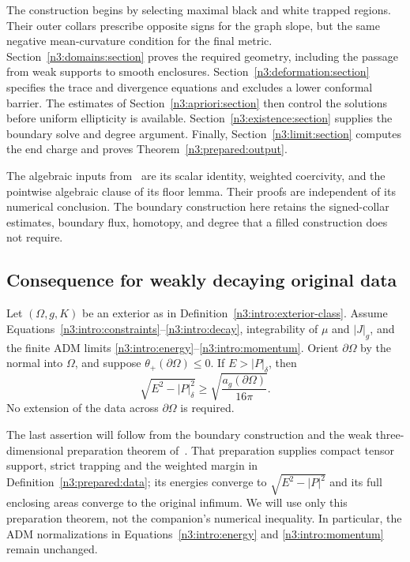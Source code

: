 The construction begins by selecting maximal black and white trapped
regions. Their outer collars prescribe opposite signs for the graph
slope, but the same negative mean-curvature condition for the final
metric. Section~\ref{n3:domains:section} proves the required geometry,
including the passage from weak supports to smooth enclosures.
Section~\ref{n3:deformation:section} specifies the trace and divergence
equations and excludes a lower conformal barrier. The estimates of
Section~\ref{n3:apriori:section} then control the solutions before
uniform ellipticity is available. Section~\ref{n3:existence:section}
supplies the boundary solve and degree argument. Finally,
Section~\ref{n3:limit:section} computes the end charge and proves
Theorem~\ref{n3:prepared:output}.

The algebraic inputs from~\cite[Propositions~4.1--4.2 and Lemma~4.3]{NumericalCompanion} are its scalar
identity, weighted coercivity, and the pointwise algebraic clause of
its floor lemma. Their
proofs are independent of its numerical conclusion. The boundary
construction here retains the signed-collar estimates, boundary flux,
homotopy, and degree that a filled construction does not require.

\subsection{Consequence for weakly decaying original data}

\begin{theorem}\label{n3:intro:exterior-inequality}
Let \((\Omega,g,K)\) be an exterior as in
Definition~\ref{n3:intro:exterior-class}. Assume
Equations~\eqref{n3:intro:constraints}--\eqref{n3:intro:decay}, integrability
of \(\mu\) and \(|J|_g\), and the finite ADM limits
\eqref{n3:intro:energy}--\eqref{n3:intro:momentum}. Orient \(\partial\Omega\)
by the normal into \(\Omega\), and suppose
\(\theta_+(\partial\Omega)\le0\). If \(E>|P|_\delta\), then
\begin{equation}\label{n3:intro:penrose}
          \sqrt{E^2-|P|_\delta^2}
               \ge \sqrt{\frac{a_g(\partial\Omega)}{16\pi}}.
\end{equation}
No extension of the data across \(\partial\Omega\) is required.
\end{theorem}


The last assertion will follow from the boundary construction and the
weak three-dimensional preparation theorem of~\cite[Proposition~7.13]{NumericalCompanion}.
That preparation supplies compact tensor support, strict trapping and
the weighted margin in Definition~\ref{n3:prepared:data}; its energies
converge to $\sqrt{E^2-|P|^2}$ and its full enclosing areas converge
to the original infimum. We will use only this preparation theorem,
not the companion's numerical inequality. In particular, the ADM
normalizations in Equations~\eqref{n3:intro:energy} and
\eqref{n3:intro:momentum} remain unchanged.
